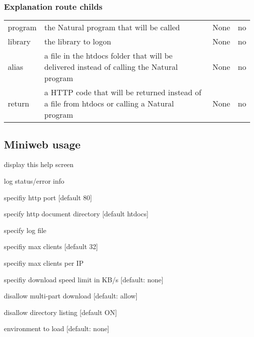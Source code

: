 \documentclass[letterpaper,10pt,english]{sphinxmanual}
\begin{document}
\subsubsection{Explanation route childs}
\label{\detokenize{webserver:explanation-route-childs}}
\noindent\begin{tabulary}{\linewidth}{|L|L|L|L|}
\hline
{}\relax &\relax &\relax &\relax \\
\hline
program
&
the Natural program that will be called
&
None
&
no
\\
\hline
library
&
the library to logon
&
None
&
no
\\
\hline
alias
&
a file in the htdocs folder that will be delivered instead of calling the Natural program
&
None
&
no
\\
\hline
return
&
a HTTP code that will be returned instead of a file from htdocs or calling a Natural program
&
None
&
no
\\
\hline\end{tabulary}



\subsection{Miniweb usage}
\label{\detokenize{webserver:miniweb-usage}}\begin{optionlist}{3cm}
\item [-h]  
display this help screen
\item [-v]  
log status/error info
\item [-p]  
specifiy http port {[}default 80{]}
\item [-r]  
specify http document directory {[}default htdocs{]}
\item [-l]  
specify log file
\item [-m]  
specifiy max clients {[}default 32{]}
\item [-M]  
specifiy max clients per IP
\item [-s]  
specifiy download speed limit in KB/s {[}default: none{]}
\item [-n]  
disallow multi-part download {[}default: allow{]}
\item [-d]  
disallow directory listing {[}default ON{]}
\item [-{-}environment]  
environment to load {[}default: none{]}
\end{optionlist}
\end{document}
